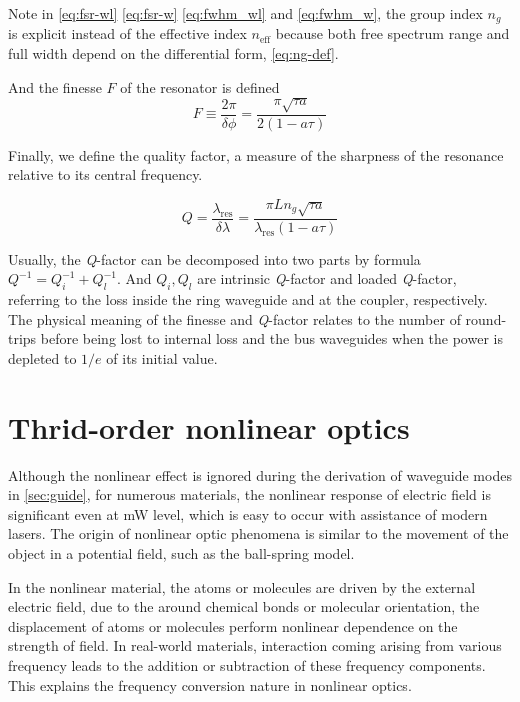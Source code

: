 Note in \autoref{eq:fsr-wl} \autoref{eq:fsr-w} \autoref{eq:fwhm_wl} and \autoref{eq:fwhm_w}, the group index $n_g$ is explicit instead of the effective index $n_\mathrm{eff}$ because both free spectrum range and full width depend on the differential form, \autoref{eq:ng-def}.

And the finesse $F$ of the resonator is defined 
\begin{equation}
    F \equiv \frac{2\pi}{\delta\phi} = \frac{\pi\sqrt{\tau a}}{2(1- a \tau)}
\end{equation}

Finally, we define the quality factor, a measure of the sharpness of the resonance relative to its central frequency.

\begin{equation}\label{eq:q-def}
    Q = \frac{\lambda_\mathrm{res}}{\delta \lambda} =  \frac{\pi L n_g \sqrt{\tau a}} {\lambda_\mathrm{res} (1- a \tau)}
\end{equation}

Usually, the \textit{Q}-factor can be decomposed into two parts by formula $Q^{-1}=Q_{i}^{-1} + Q_{l}^{-1}$. And $Q_{i}, Q_{l}$ are intrinsic \textit{Q}-factor and loaded \textit{Q}-factor, referring to the loss inside the ring waveguide and at the coupler, respectively. The physical meaning of the finesse and \textit{Q}-factor relates to the number of round-trips before being lost to internal loss and the bus waveguides when the power is depleted to $1/e$ of its initial value.

\section{Thrid-order nonlinear optics}

Although the nonlinear effect is ignored during the derivation of waveguide modes in \autoref{sec:guide}, 
for numerous materials, the nonlinear response of electric field is significant even at mW level, which is easy to occur with assistance of modern lasers. The origin of nonlinear optic phenomena is similar to the movement of the object in a potential field, such as the ball-spring model. 

In the nonlinear material, the atoms or molecules are driven by the external electric field, due to the around chemical bonds or molecular orientation, the displacement of atoms or molecules perform nonlinear dependence on the strength of field. In real-world materials, interaction coming arising from various frequency leads to the addition or subtraction of these frequency components. This explains the frequency conversion nature in nonlinear optics.

